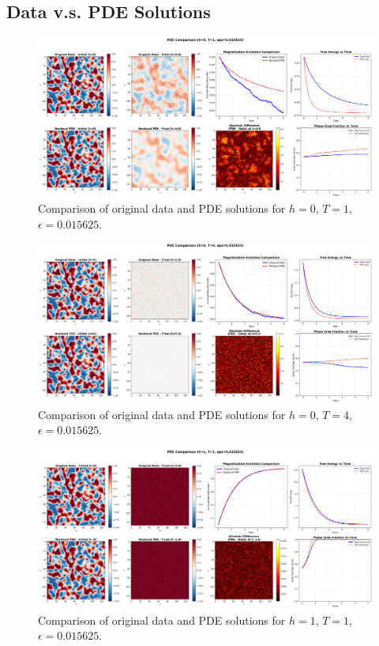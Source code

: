 \documentclass[11pt,a4paper]{article}
\begin{document}
\subsection{Data v.s. PDE Solutions}


\begin{figure}[!h]
    \centering
    \includegraphics[width=1.0\textwidth]{fig/pde_comparison_h0_T1_eps0.015625.png}
    \caption{Comparison of original data and PDE solutions for $h=0$, $T=1$, $\epsilon=0.015625$.}
\end{figure}


\begin{figure}[!h]
    \centering
    \includegraphics[width=1.0\textwidth]{fig/pde_comparison_h0_T4_eps0.015625.png}
    \caption{Comparison of original data and PDE solutions for $h=0$, $T=4$, $\epsilon=0.015625$.}
\end{figure}


\begin{figure}[!h]
    \centering
    \includegraphics[width=1.0\textwidth]{fig/pde_comparison_h1_T1_eps0.015625.png}
    \caption{Comparison of original data and PDE solutions for $h=1$, $T=1$, $\epsilon=0.015625$.}
\end{figure}
\end{document}
